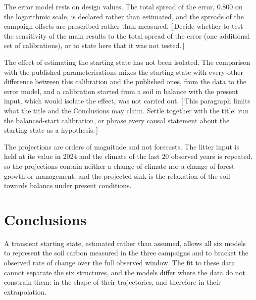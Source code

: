 \documentclass[11pt]{article}
\newcommand{\gap}[1]{\textcolor{red!70!black}{\small[\,#1\,]}}
\begin{document}
The error model rests on design values. The total spread of the error, $0.800$ on the
logarithmic scale, is declared rather than estimated, and the spreads of the campaign
offsets are prescribed rather than measured.
\gap{Decide whether to test the sensitivity of the main results to the total spread of
the error (one additional set of calibrations), or to state here that it was not tested.}

The effect of estimating the starting state has not been isolated. The comparison with the
published parameterisations mixes the starting state with every other difference between
this calibration and the published ones, from the data to the error model, and a
calibration started from a soil in balance with the present input, which would isolate
the effect, was not carried out.
\gap{This paragraph limits what the title and the Conclusions may claim. Settle together
with the title: run the balanced-start calibration, or phrase every causal statement
about the starting state as a hypothesis.}

The projections are orders of magnitude and not forecasts. The litter input is held at
its value in 2024 and the climate of the last $20$ observed years is repeated, so the
projections contain neither a change of climate nor a change of forest growth or
management, and the projected sink is the relaxation of the soil towards balance under
present conditions.

\section{Conclusions}

A transient starting state, estimated rather than assumed, allows all six models to
represent the soil carbon measured in the three campaigns and to bracket the observed
rate of change over the full observed window. The fit to these data cannot separate
the six structures, and the models differ where the data do not constrain them: in
the shape of their trajectories, and therefore in their extrapolation.
\end{document}

